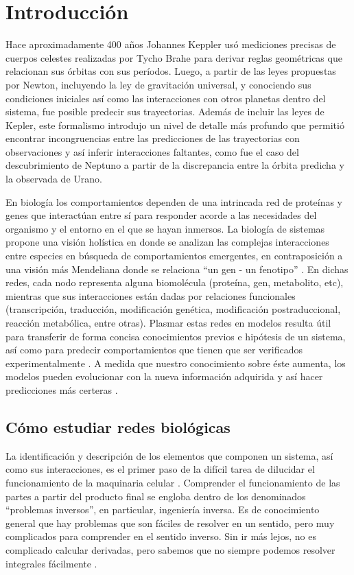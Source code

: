 \chapter{Introducción}


Hace aproximadamente 400 años Johannes Keppler usó  mediciones precisas de cuerpos celestes realizadas por Tycho Brahe para derivar reglas geométricas que relacionan sus órbitas con sus períodos. Luego, a partir de las leyes propuestas por Newton, incluyendo la ley de gravitación universal, y conociendo sus condiciones iniciales así como las interacciones con otros planetas dentro del sistema, fue posible predecir sus trayectorias. Además de incluir las leyes de Kepler, este formalismo introdujo un nivel de detalle más profundo que permitió encontrar incongruencias entre las predicciones de las trayectorias con observaciones y así inferir interacciones faltantes, como fue el caso del descubrimiento de Neptuno a partir de la discrepancia entre la órbita predicha y la observada de Urano.

En biología los comportamientos dependen de una intrincada red de proteínas y genes que interactúan entre sí para responder acorde a las necesidades del organismo y el entorno en el que se hayan inmersos. La biología de sistemas propone una visión holística en donde se analizan las complejas interacciones entre especies en búsqueda de comportamientos emergentes, en contraposición a una visión más Mendeliana donde se relaciona ``un gen - un fenotipo'' \citep{Han2008}. En dichas redes, cada nodo representa alguna biomolécula (proteína, gen, metabolito, etc), mientras que sus interacciones están dadas por relaciones funcionales (transcripción, traducción, modificación genética, modificación postraduccional, reacción metabólica, entre otras). Plasmar estas redes en modelos resulta útil para transferir de forma concisa conocimientos previos e hipótesis de un sistema, así como para predecir comportamientos que tienen que ser verificados experimentalmente \citep{Aldridge2006}. A medida que nuestro conocimiento sobre éste aumenta, los modelos pueden evolucionar con la nueva información adquirida y así hacer predicciones más certeras \citep{Vayttaden2004}. 


\section{Cómo estudiar redes biológicas}
\label{sec:intro:EstudiarRedes}


La identificación y descripción de los elementos que componen un sistema, así como sus interacciones, es el primer paso de la difícil tarea de dilucidar el funcionamiento de la maquinaria celular \citep{Grecco2008}. Comprender el funcionamiento de las partes a partir del producto final se engloba dentro de los denominados ``problemas inversos'', en particular, ingeniería inversa. Es de conocimiento general que hay problemas que son fáciles de resolver en un sentido, pero muy complicados para comprender en el sentido inverso. Sin ir más lejos, no es complicado calcular derivadas, pero sabemos que no siempre podemos resolver integrales fácilmente \citep{Milotti2013}.

